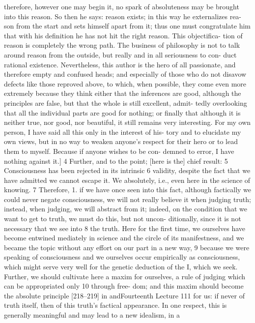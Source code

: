 therefore, however one may begin it, no spark of absoluteness may be brought
into this reason. So then he says: reason exists; in this way he externalizes rea-
son from the start and sets himself apart from it; thus one must congratulate
him that with his definition he has not hit the right reason. This objectifica-
tion of reason is completely the wrong path. The business of philosophy is not
to talk around reason from the outside, but really and in all seriousness to con-
duct rational existence. Nevertheless, this author is the hero of all passionate,
and therefore empty and confused heads; and especially of those who do not
disavow defects like those reproved above, to which, when possible, they come
even more extremely because they think either that the inferences are good,
although the principles are false, but that the whole is still excellent, admit-
tedly overlooking that all the individual parts are good for nothing; or finally
that although it is neither true, nor good, nor beautiful, it still remains very
interesting. For my own person, I have said all this only in the interest of his-
tory and to elucidate my own views, but in no way to weaken anyone’s respect
for their hero or to lead them to myself. Because if anyone wishes to be con-
demned to error, I have nothing against it.] 4
Further, and to the point; [here is the] chief result: 5
Consciousness has been rejected in its intrinsic 6 validity, despite the fact
that we have admitted we cannot escape it. We absolutely, i.e., even here in the
science of knowing. 7 Therefore, 1. if we have once seen into this fact, although
factically we could never negate consciousness, we will not really believe it
when judging truth; instead, when judging, we will abstract from it; indeed,
on the condition that we want to get to truth, we must do this, but not uncon-
ditionally, since it is not necessary that we see into 8 the truth. Here for the first
time, we ourselves have become entwined mediately in science and the circle of
its manifestness, and we became the topic without any effort on our part in a
new way, 9 because we were speaking of consciousness and we ourselves occur
empirically as consciousness, which might serve very well for the genetic
deduction of the I, which we seek. Further, we should cultivate here a maxim
for ourselves, a rule of judging which can be appropriated only 10 through free-
dom; and this maxim should become the absolute principle [218–219] in andFourteenth Lecture
111
for us: if never of truth itself, then of this truth’s factical appearance. In one
respect, this is generally meaningful and may lead to a new idealism, in a

